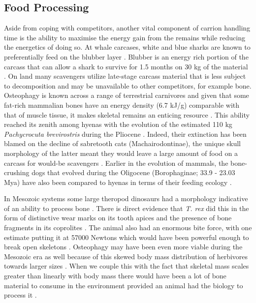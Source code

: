 \documentclass[a4paper,12pt]{article}
\begin{document}
\subsection*{Food Processing}
Aside from coping with competitors, another vital component of carrion handling time is the ability to maximise the energy gain from the remains while reducing the energetics of doing so. 
At whale carcases, white and blue sharks are known to preferentially feed on the blubber layer \citep{long1996sharks}. 
Blubber is an energy rich portion of the carcass that can allow a shark to survive for 1.5 months on 30 kg of the material \citep{carey1982temperature}. 
On land many scavengers utilize late-stage carcass material that is less subject to decomposition and may be unavailable to other competitors, for example bone.
Osteophagy is known across a range of terrestrial carnivores and given that some fat-rich mammalian bones have an energy density (6.7 kJ/g) comparable with that of muscle tissue, it makes skeletal remains an enticing resource \citep{brown1989study}.
This ability reached its zenith among hyenas with the evolution of the estimated 110 kg \textit{Pachycrocuta brevirostris} during the Pliocene \citep[3.6 - 2.58 Mya; ][]{palmqvist2011giant}.
Indeed, their extinction has been blamed on the decline of sabretooth cats (Machairodontinae), the unique skull morphology of the latter meant they would leave a large amount of food on a carcass for would-be scavengers \citep{palmqvist2011giant}. 
Earlier in the evolution of mammals, the bone-crushing dogs that evolved during the Oligocene (Borophaginae; 33.9 - 23.03 Mya) have also been compared to hyenas in terms of their feeding ecology \citep{van2003chapter,martin2016pursuit}.

In Mesozoic systems some large theropod dinosaurs had a morphology indicative of an ability to process bone \citep[e.g. the robust skull and dentition of \textit{Tyrannosaurus rex;}][]{hone2010feeding}.
There is direct evidence that \textit{T. rex} did this in the form of distinctive wear marks on its tooth apices \citep{farlow1994wear,schubert2005wear} and the presence of bone fragments in its coprolites \citep{chin1998king}.
The animal also had an enormous bite force, with one estimate putting it at 57000 Newtons \citep{bates2012estimating} which would have been powerful enough to break open skeletons \citep{rayfield2001cranial}.
Osteophagy may have been even more viable during the Mesozoic era as well because of this skewed body mass distribution of herbivores towards larger sizes \citep{10.1371/journal.pone.0051925}.
When we couple this with the fact that skeletal mass scales greater than linearly with body mass \citep{prange1979scaling} there would have been a lot of bone material to consume in the environment provided an animal had the biology to process it \citep{chure1997one}.
\end{document}

